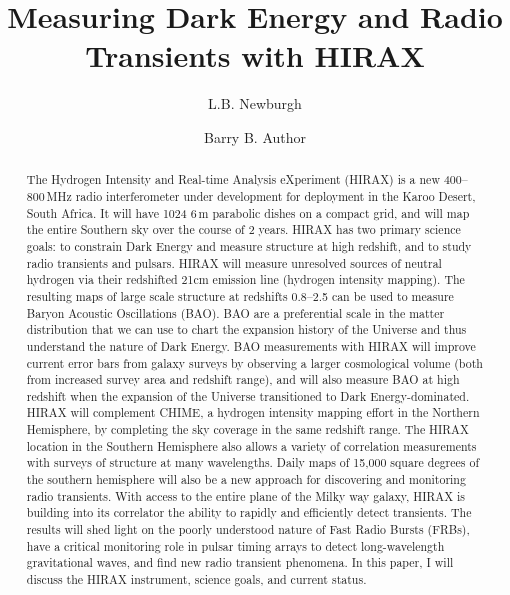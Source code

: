 \documentclass[]{spie}  %
\title{Measuring Dark Energy and Radio Transients with HIRAX}
\author[a]{L.B. Newburgh}
\author[b]{Barry B. Author}
\affil[a]{Dunlap Institute, University of Toronto, 50 St. George St., Toronto, Canada}
\affil[b]{Affiliation2, Address, City, Country}
\begin{document}
 
\maketitle

\begin{abstract}
The Hydrogen Intensity and Real-time Analysis eXperiment (HIRAX) is a new 400--800\,MHz radio interferometer under development for deployment in the Karoo Desert, South Africa. It will have 1024 6\,m parabolic dishes on a compact grid, and will map the entire Southern sky over the course of 2 years. HIRAX has two primary science goals: to constrain Dark Energy and measure structure at high redshift, and to study radio transients and pulsars. HIRAX will measure unresolved sources of neutral hydrogen via their redshifted 21cm emission line (hydrogen intensity mapping). The resulting maps of large scale structure at redshifts 0.8--2.5 can be used to measure Baryon Acoustic Oscillations (BAO). BAO are a preferential scale in the matter distribution that we can use to chart the expansion history of the Universe and thus understand the nature of Dark Energy. BAO measurements with HIRAX will improve current error bars from galaxy surveys by observing a larger cosmological volume (both from increased survey area and redshift range), and will also measure BAO at high redshift when the expansion of the Universe transitioned to Dark Energy-dominated. HIRAX will complement CHIME, a hydrogen intensity mapping effort in the Northern Hemisphere, by completing the sky coverage in the same redshift range. The HIRAX location in the Southern Hemisphere also allows a variety of correlation measurements with surveys of structure at many wavelengths. Daily maps of 15,000 square degrees of the southern hemisphere will also be a new approach for discovering and monitoring radio transients. With access to the entire plane of the Milky way galaxy, HIRAX is building into its correlator the ability to rapidly and efficiently detect transients. The results will shed light on the poorly understood nature of Fast Radio Bursts (FRBs), have a critical monitoring role in pulsar timing arrays to detect long-wavelength gravitational waves, and find new radio transient phenomena. In this paper, I will discuss the HIRAX instrument, science goals, and current status.
\end{abstract}

\end{document}
